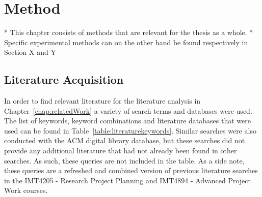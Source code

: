 \chapter{Method} \label{chap:generalmethods}
* This chapter consists of methods that are relevant for the thesis as a whole.
* Specific experimental methods can on the other hand be found respectively in Section X and Y 

\section{Literature Acquisition}
In order to find relevant literature for the literature analysis in Chapter~\ref{chap:relatedWork} a variety of search terms and databases were used. The list of keywords, keyword combinations and literature databases that were used can be found in Table~\ref{table:literaturekeywords}. 
Similar searches were also conducted with the ACM digital library database, but these searches did not provide any additional literature that had not already been found in other searches. As such, these queries are not included in the table. As a side note, these queries are a refreshed and combined version of previous literature searches in the IMT4205 - Research Project Planning and IMT4894 - Advanced Project Work courses. 

